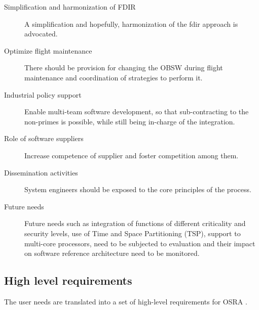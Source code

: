 \begin{description}
\item [Simplification and harmonization of FDIR] A simplification and hopefully, harmonization of the \ac{fdir} approach is advocated.

\item [Optimize flight maintenance] There should be provision for changing the OBSW during flight maintenance and coordination of strategies to perform it. 

\item [Industrial policy support] Enable multi-team software development, so that sub-contracting to the non-primes is possible, while still being in-charge of the integration.

\item [Role of software suppliers] Increase competence of supplier and foster competition among them. 

\item [Dissemination activities] System engineers should be exposed to the core principles of the process.

\item [Future needs] Future needs such as integration of functions of different criticality and security levels, use of Time and Space Partitioning (TSP), support to multi-core processors, need to be subjected to evaluation and their impact on software reference architecture need to be monitored.
\end{description} 

\subsection{High level requirements}
\label{subsection: High level requirements}
The user needs are translated into a set of high-level requirements for OSRA \cite{SAVOIR}\cite{PhdThesis}.

